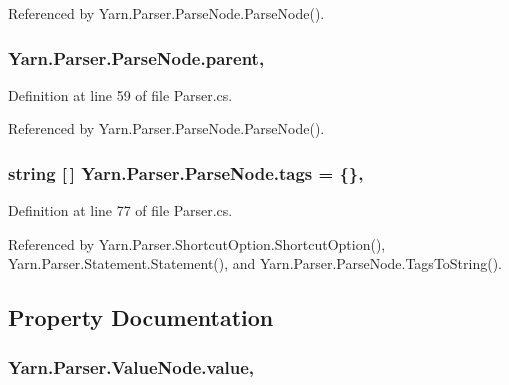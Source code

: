 Referenced by Yarn.\-Parser.\-Parse\-Node.\-Parse\-Node().

\hypertarget{a00148_af313a82103fcc2ff5a177dbb06b92f7b}{
\subsubsection[{parent}]{ Yarn.\-Parser.\-Parse\-Node.\-parent\hspace{0.3cm}{\ttfamily [package]}, {\ttfamily [inherited]}}}\label{a00148_af313a82103fcc2ff5a177dbb06b92f7b}


Definition at line 59 of file Parser.\-cs.



Referenced by Yarn.\-Parser.\-Parse\-Node.\-Parse\-Node().

\hypertarget{a00148_a58b3a15788fd2d4127d73619dc6d04ae}{
\subsubsection[{tags}]{\setlength{\rightskip}{0pt plus 5cm}string \mbox{[}$\,$\mbox{]} Yarn.\-Parser.\-Parse\-Node.\-tags = \{\}\hspace{0.3cm}{\ttfamily [package]}, {\ttfamily [inherited]}}}\label{a00148_a58b3a15788fd2d4127d73619dc6d04ae}


Definition at line 77 of file Parser.\-cs.



Referenced by Yarn.\-Parser.\-Shortcut\-Option.\-Shortcut\-Option(), Yarn.\-Parser.\-Statement.\-Statement(), and Yarn.\-Parser.\-Parse\-Node.\-Tags\-To\-String().



\subsection{Property Documentation}
\hypertarget{a00188_a51ab5939344f9bfa21181c02cf0e341d}{
\subsubsection[{value}]{ Yarn.\-Parser.\-Value\-Node.\-value\hspace{0.3cm}{\ttfamily [get]}, {\ttfamily [set]}}}\label{a00188_a51ab5939344f9bfa21181c02cf0e341d}


